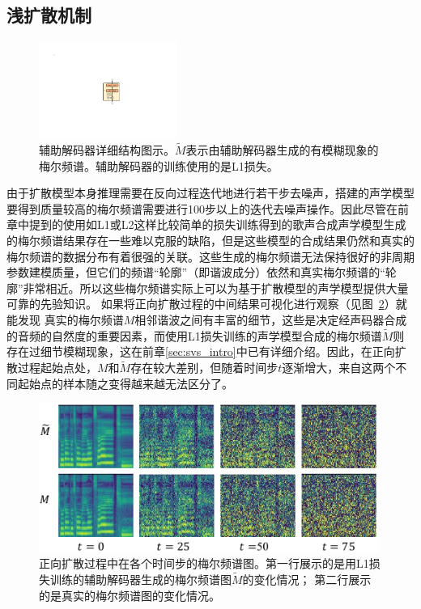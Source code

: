 \subsection{浅扩散机制}
\label{sec:shallow_mechanism}
\begin{figure}[!h]
	\centering
	\includegraphics[width=0.40\textwidth,clip=true]{figure/svs/auxiliary_decoder.pdf}
	\caption{辅助解码器详细结构图示。$\widetilde{M}$表示由辅助解码器生成的有模糊现象的梅尔频谱。辅助解码器的训练使用的是L1损失。}
	\label{supfig:aux_decoder}
\end{figure}
由于扩散模型本身推理需要在反向过程迭代地进行若干步去噪声，搭建的声学模型要得到质量较高的梅尔频谱需要进行100步以上的迭代去噪声操作。因此尽管在前章中提到的使用如L1或L2这样比较简单的损失训练得到的歌声合成声学模型生成的梅尔频谱结果存在一些难以克服的缺陷，但是这些模型的合成结果仍然和真实的梅尔频谱的数据分布有着很强的关联。这些生成的梅尔频谱无法保持很好的非周期参数建模质量，但它们的频谱``轮廓''（即谐波成分）依然和真实梅尔频谱的``轮廓''非常相近。所以这些梅尔频谱实际上可以为基于扩散模型的声学模型提供大量可靠的先验知识。
如果将正向扩散过程的中间结果可视化进行观察（见图~\ref{fig:fake_real_mels_diffusion}）就能发现
真实的梅尔频谱$M$相邻谐波之间有丰富的细节，这些是决定经声码器合成的音频的自然度的重要因素，而使用L1损失训练的声学模型合成的梅尔频谱$\widetilde{M}$则存在过细节模糊现象，这在前章\ref{sec:svs_intro}中已有详细介绍。因此，在正向扩散过程起始点处，$M$和$\widetilde{M}$存在较大差别，但随着时间步$t$逐渐增大，来自这两个不同起始点的样本随之变得越来越无法区分了。
\begin{figure}[!h]
    \centering
    \includegraphics[width=0.99\textwidth,]{figure/svs/fake_real_mel.pdf}
    \caption{正向扩散过程中在各个时间步的梅尔频谱图。第一行展示的是用L1损失训练的辅助解码器生成的梅尔频谱图$\widetilde{M}$的变化情况； 第二行展示的是真实的梅尔频谱图的变化情况。}
    \label{fig:fake_real_mels_diffusion}
\end{figure}
